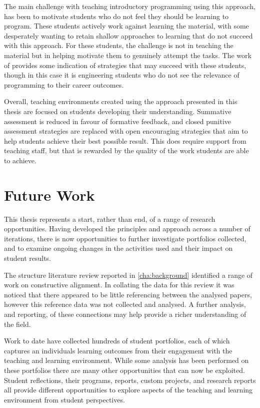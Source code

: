 The main challenge with teaching introductory programming using this approach, has been to motivate students who do not feel they should be learning to program. These students actively work against learning the material, with some desperately wanting to retain shallow approaches to learning that do not succeed with this approach. For these students, the challenge is not in teaching the material but in helping motivate them to genuinely attempt the tasks. The work of \citet{Guzdial:2005} provides some indication of strategies that may succeed with these students, though in this case it is engineering students who do not see the relevance of programming to their career outcomes. 

Overall, teaching environments created using the approach presented in this thesis are focused on students developing their understanding. Summative assessment is reduced in favour of formative feedback, and closed punitive assessment strategies are replaced with open encouraging strategies that aim to help students achieve their best possible result. This does require support from teaching staff, but that is rewarded by the quality of the work students are able to achieve. 


\section{Future Work} %
\label{sec:future_work}

This thesis represents a start, rather than end, of a range of research opportunities. Having developed the principles and approach across a number of iterations, there is now opportunities to further investigate portfolios collected, and to examine ongoing changes in the activities used and their impact on student results.

The structure literature review reported in \cref{cha:background} identified a range of work on constructive alignment. In collating the data for this review it was noticed that there appeared to be little referencing between the analysed papers, however this reference data was not collected and analysed. A further analysis, and reporting, of these connections may help provide a richer understanding of the field.

Work to date have collected hundreds of student portfolios, each of which captures an individuals learning outcomes from their engagement with the teaching and learning environment. While some analysis has been performed on these portfolios there are many other opportunities that can now be exploited. Student reflections, their programs, reports, custom projects, and research reports all provide different opportunities to explore aspects of the teaching and learning environment from student perspectives.

